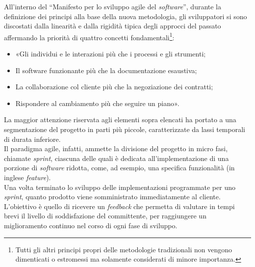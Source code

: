 All'interno del “Manifesto per lo sviluppo agile del \textit{software}”, durante la definizione dei principi alla base della nuova metodologia, gli sviluppatori si sono discostati dalla linearità e dalla rigidità tipica degli approcci del passato affermando la priorità di quattro concetti fondamentali\footnote{Tutti gli altri principi propri delle metodologie tradizionali non vengono dimenticati o estromessi ma solamente considerati di minore importanza.}:
\begin{itemize}
  \item «Gli individui e le interazioni più che i processi e gli strumenti;
  
  \item Il software funzionante più che la documentazione esaustiva;
  
  \item La collaborazione col cliente più che la negoziazione dei contratti;
  
  \item Rispondere al cambiamento più che seguire un piano»\cite{BeckEtAl_ManifestoSviluppoAgileSoftware}. 
\end{itemize}
La maggior attenzione riservata agli elementi sopra elencati ha portato a una segmentazione del progetto in parti più piccole, caratterizzate da lassi temporali di durata inferiore.\\
Il paradigma agile, infatti, ammette la divisione del progetto in micro fasi, chiamate \textit{sprint}, ciascuna delle quali è dedicata all'implementazione di una porzione di \textit{software} ridotta, come, ad esempio, una specifica funzionalità (in inglese \textit{feature}).\\  
Una volta terminato lo sviluppo delle implementazioni programmate per uno \textit{sprint}, quanto prodotto viene somministrato immediatamente al cliente. L'obiettivo è quello di ricevere un \textit{feedback} che permetta di valutare in tempi brevi il livello di soddisfazione del committente, per raggiungere un miglioramento continuo nel corso di ogni fase di sviluppo.

